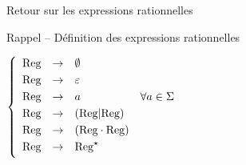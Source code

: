 \begin{frame}{Retour sur les expressions rationnelles}
\begin{block}{Rappel -- Définition des expressions rationnelles}
\begin{minipage}{.5\textwidth}
      \vspace{2mm}
      $\left\{\begin{array}{llll}
      \vspace{1mm}\text{Reg} &\rightarrow& \emptyset \\
      \vspace{1mm}\text{Reg} &\rightarrow& \varepsilon \\
      \vspace{1mm}\text{Reg} &\rightarrow& a & \forall a\in \Sigma \\
      \vspace{1mm}\text{Reg} &\rightarrow& (\text{Reg} | \text{Reg}) \\
      \vspace{1mm}\text{Reg} &\rightarrow& (\text{Reg} \cdot \text{Reg}) \\
      \vspace{1mm}\text{Reg} &\rightarrow& \text{Reg}^\star \\
      \end{array}\right.$
    \end{minipage}%
  \end{block}

\end{frame}

\endgroup
\endinput
